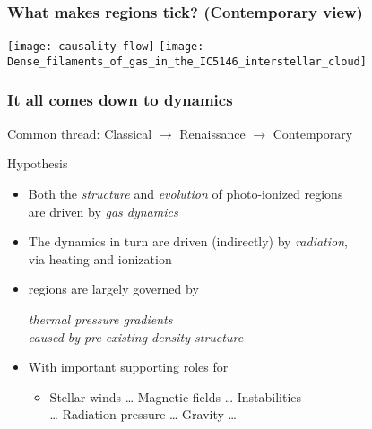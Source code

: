 \documentclass[presentation]{beamer}
\begin{document}
\begin{frame}
  \frametitle{What makes \hii{} regions tick? (Contemporary view)}
  \hfill\texttt{[image: causality-flow]} \hfill
  \texttt{[image: Dense\_filaments\_of\_gas\_in\_the\_IC5146\_interstellar\_cloud]}\hfill
 \end{frame}

\begin{frame}
  \frametitle{It all comes down to dynamics}
  Common thread: Classical \(\to\) Renaissance \(\to\) Contemporary
  \begin{block}{Hypothesis}
    \begin{itemize}
    \item Both the \textit{structure} and \textit{evolution} of
      photo-ionized regions\\ are driven by \textit{gas dynamics}
    \item The dynamics in turn are driven (indirectly) by
      \textit{radiation},\\ via heating and ionization
    \item \hii{} regions are largely governed by
      \begin{center}\itshape
        \alert{thermal pressure gradients\\ caused by pre-existing
          density structure}
      \end{center}\smallskip
    \item With important supporting roles for
      \begin{itemize}
      \item 
        Stellar winds \quad \dots
      \quad Magnetic fields \quad \dots
      \quad Instabilities \\
      \quad \dots
      \quad Radiation pressure \quad \dots
      \quad Gravity \quad \dots
      \end{itemize}
    \end{itemize}
  \end{block}
\end{frame}
\end{document}
